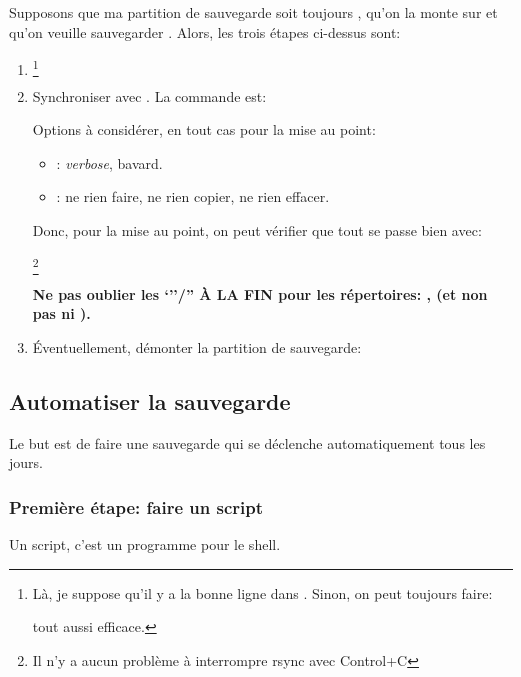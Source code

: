 Supposons que ma partition de sauvegarde soit toujours
, qu'on la monte sur  et qu'on veuille
  sauvegarder . Alors, les trois étapes ci-dessus sont:
\begin{enumerate}
  \item {}\footnote{Là, je suppose qu'il y a la bonne ligne
    dans .  Sinon, on peut toujours faire:


    tout aussi efficace.
  }
    
  \item Synchroniser avec .  La commande est:

    

    Options à considérer, en tout cas pour la mise au point:

     \begin{itemize}
     \item {}: \emph{verbose}, bavard.
     \item {}: ne rien faire, ne rien copier, ne rien
       effacer.
     \end{itemize}

     Donc, pour la mise au point, on peut vérifier que tout se passe
     bien avec:

     \footnote{Il n'y a 
       aucun problème à interrompre rsync avec Control+C}

     \textdbend\textdbend

     \textbf{Ne pas oublier les `''/'' \`A LA FIN pour les
       répertoires:  ,  (et non pas
        ni ).} 

     \textdbend\textdbend
       
     
  \item Éventuellement, démonter la partition de sauvegarde:

\end{enumerate}

\subsection{Automatiser la sauvegarde}
Le but est de faire une sauvegarde qui se déclenche automatiquement
tous les jours.

\subsubsection{Première étape: faire un \og script\fg}
Un script, c'est un programme pour le shell.\label{save1}

